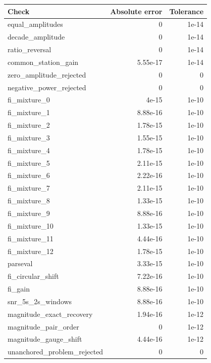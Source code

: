 \begin{longtable}{lr r}
\toprule
Check & Absolute error & Tolerance\\\midrule
\endhead
equal\_amplitudes & 0 & 1e-14\\[3pt]
decade\_amplitude & 0 & 1e-14\\[3pt]
ratio\_reversal & 0 & 1e-14\\[3pt]
common\_station\_gain & 5.55e-17 & 1e-14\\[3pt]
zero\_amplitude\_rejected & 0 & 0\\[3pt]
negative\_power\_rejected & 0 & 0\\[3pt]
fi\_mixture\_0 & 4e-15 & 1e-10\\[3pt]
fi\_mixture\_1 & 8.88e-16 & 1e-10\\[3pt]
fi\_mixture\_2 & 1.78e-15 & 1e-10\\[3pt]
fi\_mixture\_3 & 1.55e-15 & 1e-10\\[3pt]
fi\_mixture\_4 & 1.78e-15 & 1e-10\\[3pt]
fi\_mixture\_5 & 2.11e-15 & 1e-10\\[3pt]
fi\_mixture\_6 & 2.22e-16 & 1e-10\\[3pt]
fi\_mixture\_7 & 2.11e-15 & 1e-10\\[3pt]
fi\_mixture\_8 & 1.33e-15 & 1e-10\\[3pt]
fi\_mixture\_9 & 8.88e-16 & 1e-10\\[3pt]
fi\_mixture\_10 & 1.33e-15 & 1e-10\\[3pt]
fi\_mixture\_11 & 4.44e-16 & 1e-10\\[3pt]
fi\_mixture\_12 & 1.78e-15 & 1e-10\\[3pt]
parseval & 3.33e-15 & 1e-10\\[3pt]
fi\_circular\_shift & 7.22e-16 & 1e-10\\[3pt]
fi\_gain & 8.88e-16 & 1e-10\\[3pt]
snr\_5s\_2s\_windows & 8.88e-16 & 1e-10\\[3pt]
magnitude\_exact\_recovery & 1.94e-16 & 1e-12\\[3pt]
magnitude\_pair\_order & 0 & 1e-12\\[3pt]
magnitude\_gauge\_shift & 4.44e-16 & 1e-12\\[3pt]
unanchored\_problem\_rejected & 0 & 0\\[3pt]
\bottomrule
\end{longtable}
